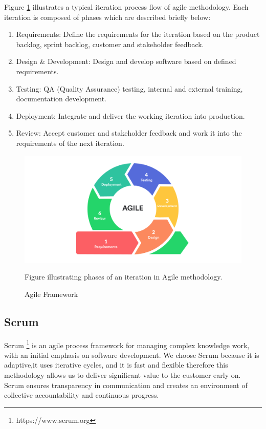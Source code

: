 Figure \ref{fig:agile_pic_cycle} illustrates a typical iteration process flow of agile methodology. Each iteration is composed of phases which are described briefly below:
\begin{enumerate}
  \item Requirements: Define the requirements for the iteration based on the product backlog, sprint backlog, customer and stakeholder feedback.
  \item Design \& Development: Design and develop software based on defined requirements.
  \item Testing: QA (Quality Assurance) testing, internal and external training, documentation development.
  \item Deployment: Integrate and deliver the working iteration into production.
  \item Review: Accept customer and stakeholder feedback and work it into the requirements of the next iteration.         
\end{enumerate}

\begin{figure} 
\centering
\includegraphics[width=16cm]{pictures/agile_pic.png}
\caption{Agile Framework}
Figure illustrating phases of an iteration in Agile methodology.
\label{fig:agile_pic_cycle}
\end{figure}

\subsection{Scrum}
\label{sec:scrum_methodology}
Scrum \footnote{https://www.scrum.org} is an agile process framework for managing complex knowledge work, with an initial emphasis on software development. 
We choose Scrum because it is adaptive,it uses iterative cycles, and it is fast and flexible therefore this methodology allows us to deliver significant value to the customer early on. Scrum ensures transparency in communication and creates an environment of collective accountability and continuous progress. 

